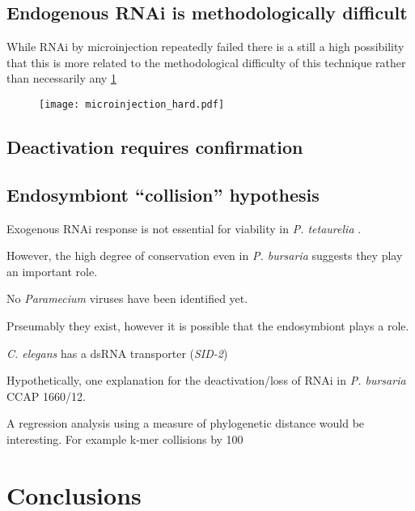 \subsection{Endogenous RNAi is methodologically difficult}


While RNAi by microinjection repeatedly failed there is a still a high possibility
that this is more related to the methodological difficulty of this technique rather than
necessarily any 
\cref{fig:microinjection_nucleus}

\begin{figure}
    \texttt{[image: microinjection\_hard.pdf]}
    \caption{}
    \label{fig:microinjection_nucleus}
\end{figure}


\subsection{Deactivation requires confirmation}





\subsection{Endosymbiont ``collision'' hypothesis}

Exogenous RNAi response is not essential for viability in \textit{P. tetaurelia}
\citep{Marker2014}.

However, the high degree of conservation even in \textit{P. bursaria}
suggests they play an important role. 

No \textit{Paramecium} viruses have been identified yet. 

Prseumably they exist, however it is possible that the endosymbiont plays a role.


\textit{C. elegans} has a dsRNA transporter (\textit{SID-2}) \citep{Nuez2012}









Hypothetically, one explanation for the deactivation/loss
of RNAi in \textit{P. bursaria} CCAP 1660/12.




A regression analysis using a measure of phylogenetic distance would be interesting.
For example k-mer collisions by 100



\section{Conclusions}

